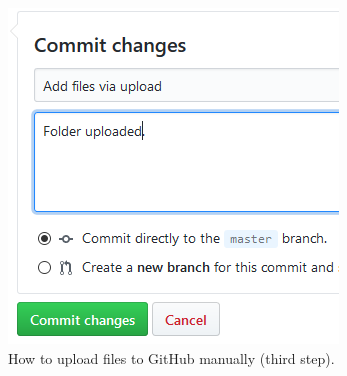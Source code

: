 \begin{figure}[h]
	\centering
	\includegraphics[width=0.5 \textwidth]{Figures/GUP2.png}
	\caption{How to upload files to GitHub manually (third step).}
	\label{fig:GitHubUpload2}
\end{figure}

